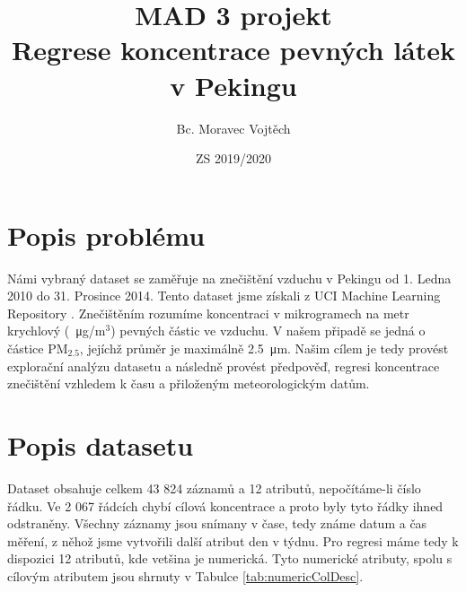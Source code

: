 \documentclass[a4paper,12pt]{article}
\author{Bc. Moravec Vojtěch}
\title{MAD 3 projekt \\ Regrese koncentrace pevných látek v Pekingu }
\date{ZS 2019/2020}
\begin{document}
\maketitle
\newpage

\tableofcontents
\newpage

\section{Popis problému}
Námi vybraný dataset \cite{beijing_data} se zaměřuje na znečištění vzduchu v Pekingu od 1. Ledna 2010 do 31. Prosince 2014.
Tento dataset jsme získali z UCI Machine Learning Repository \cite{Dua:2019}.
Znečištěním rozumíme koncentraci v mikrogramech na metr krychlový (\SI{}{\micro\gram}/$\text{m}^3$) pevných částic ve vzduchu.
V našem připadě se jedná o částice $\text{PM}_{2.5}$, jejíchž průměr je maximálně \SI{2,5}{\micro\metre}.
Našim cílem je tedy provést explorační analýzu datasetu a následně provést předpověď, regresi koncentrace znečištění
vzhledem k času a přiloženým meteorologickým datům.  

\section{Popis datasetu}
Dataset obsahuje celkem 43 824 záznamů a 12 atributů, nepočítáme-li číslo řádku. Ve 2 067 řádcích chybí cílová 
koncentrace a proto byly tyto řádky ihned odstraněny. Všechny záznamy jsou snímany v čase, tedy známe datum a čas měření, z něhož
jsme vytvořili další atribut den v týdnu. Pro regresi máme tedy k dispozici 12 atributů, kde vetšina je numerická. 
Tyto numerické atributy, spolu s cílovým atributem jsou shrnuty v Tabulce \ref{tab:numericColDesc}.
\end{document}
